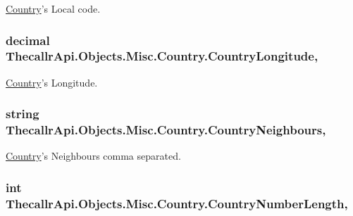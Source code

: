 \hyperlink{class_thecallr_api_1_1_objects_1_1_misc_1_1_country}{Country}'s Local code. 

\hypertarget{class_thecallr_api_1_1_objects_1_1_misc_1_1_country_acf631d893a02b4f081522c6522d2dde2}{
\subsubsection[{Country\+Longitude}]{\setlength{\rightskip}{0pt plus 5cm}decimal Thecallr\+Api.\+Objects.\+Misc.\+Country.\+Country\+Longitude\hspace{0.3cm}{\ttfamily [get]}, {\ttfamily [set]}}}\label{class_thecallr_api_1_1_objects_1_1_misc_1_1_country_acf631d893a02b4f081522c6522d2dde2}


\hyperlink{class_thecallr_api_1_1_objects_1_1_misc_1_1_country}{Country}'s Longitude. 

\hypertarget{class_thecallr_api_1_1_objects_1_1_misc_1_1_country_ae82d3d4498f1d42d328170943a50ade3}{
\subsubsection[{Country\+Neighbours}]{\setlength{\rightskip}{0pt plus 5cm}string Thecallr\+Api.\+Objects.\+Misc.\+Country.\+Country\+Neighbours\hspace{0.3cm}{\ttfamily [get]}, {\ttfamily [set]}}}\label{class_thecallr_api_1_1_objects_1_1_misc_1_1_country_ae82d3d4498f1d42d328170943a50ade3}


\hyperlink{class_thecallr_api_1_1_objects_1_1_misc_1_1_country}{Country}'s Neighbours comma separated. 

\hypertarget{class_thecallr_api_1_1_objects_1_1_misc_1_1_country_ab0e2b34c8e39eb40e9ae4cbfad2f5810}{
\subsubsection[{Country\+Number\+Length}]{\setlength{\rightskip}{0pt plus 5cm}int Thecallr\+Api.\+Objects.\+Misc.\+Country.\+Country\+Number\+Length\hspace{0.3cm}{\ttfamily [get]}, {\ttfamily [set]}}}\label{class_thecallr_api_1_1_objects_1_1_misc_1_1_country_ab0e2b34c8e39eb40e9ae4cbfad2f5810}


